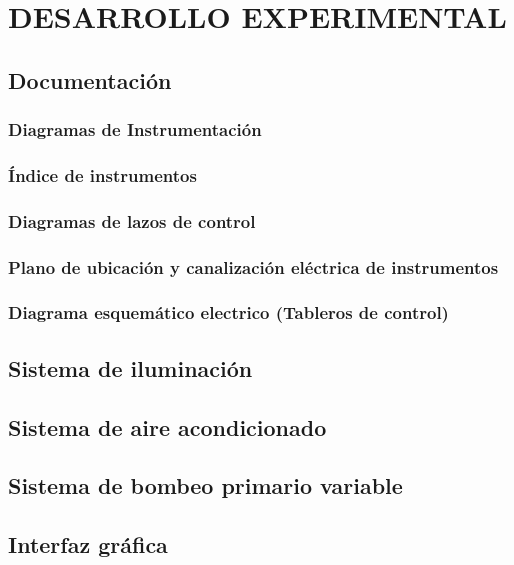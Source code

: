 \chapter{DESARROLLO EXPERIMENTAL}
\thispagestyle{empty}

\section{Documentación}
\subsection{Diagramas de Instrumentación}
\subsection{Índice de instrumentos}
\subsection{Diagramas de lazos de control}
\subsection{Plano de ubicación y canalización eléctrica de instrumentos}
\subsection{Diagrama esquemático electrico (Tableros de control)}
\section{Sistema de iluminación}
\section{Sistema de aire acondicionado}
\section{Sistema de bombeo primario variable}
\section{Interfaz gráfica}